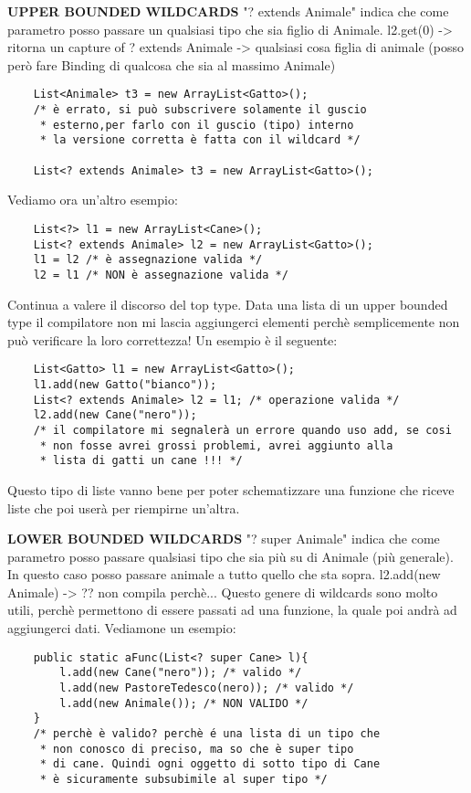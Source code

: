 \noindent \textbf{UPPER BOUNDED WILDCARDS} \newline
"? extends Animale" indica che come parametro posso passare un qualsiasi tipo che sia figlio di Animale. \newline
l2.get(0) -> ritorna un capture of ? extends Animale -> qualsiasi cosa figlia di animale (posso però fare Binding di qualcosa che sia al massimo Animale) \newline
\begin{lstlisting}
	List<Animale> t3 = new ArrayList<Gatto>();
	/* è errato, si può subscrivere solamente il guscio
	 * esterno,per farlo con il guscio (tipo) interno
	 * la versione corretta è fatta con il wildcard */
	
	List<? extends Animale> t3 = new ArrayList<Gatto>();
\end{lstlisting}
Vediamo ora un'altro esempio:
\begin{lstlisting}
	List<?> l1 = new ArrayList<Cane>();
	List<? extends Animale> l2 = new ArrayList<Gatto>();
	l1 = l2 /* è assegnazione valida */
	l2 = l1 /* NON è assegnazione valida */
\end{lstlisting}
\noindent Continua a valere il discorso del top type. Data una lista di un upper bounded type il compilatore non mi lascia aggiungerci elementi perchè semplicemente non può verificare la loro correttezza! Un esempio è il seguente:
\begin{lstlisting}
	List<Gatto> l1 = new ArrayList<Gatto>();
	l1.add(new Gatto("bianco"));
	List<? extends Animale> l2 = l1; /* operazione valida */
	l2.add(new Cane("nero"));
	/* il compilatore mi segnalerà un errore quando uso add, se cosi
	 * non fosse avrei grossi problemi, avrei aggiunto alla
	 * lista di gatti un cane !!! */
\end{lstlisting}
\noindent Questo tipo di liste vanno bene per poter schematizzare una funzione che riceve liste che poi userà per riempirne un'altra.

\noindent \textbf{LOWER BOUNDED WILDCARDS} \newline
"? super Animale" indica che come parametro posso passare qualsiasi tipo che sia più su di Animale (più generale).\newline
In questo caso posso passare animale a tutto quello che sta sopra. \newline
l2.add(new Animale) -> ?? non compila perchè... \newline
Questo genere di wildcards sono molto utili, perchè permettono di essere passati ad una funzione, la quale poi andrà ad aggiungerci dati. Vediamone un esempio:
\begin{lstlisting}
	public static aFunc(List<? super Cane> l){
		l.add(new Cane("nero")); /* valido */
		l.add(new PastoreTedesco(nero)); /* valido */
		l.add(new Animale()); /* NON VALIDO */
	}
	/* perchè è valido? perchè é una lista di un tipo che
	 * non conosco di preciso, ma so che è super tipo 
	 * di cane. Quindi ogni oggetto di sotto tipo di Cane
	 * è sicuramente subsubimile al super tipo */
\end{lstlisting}


